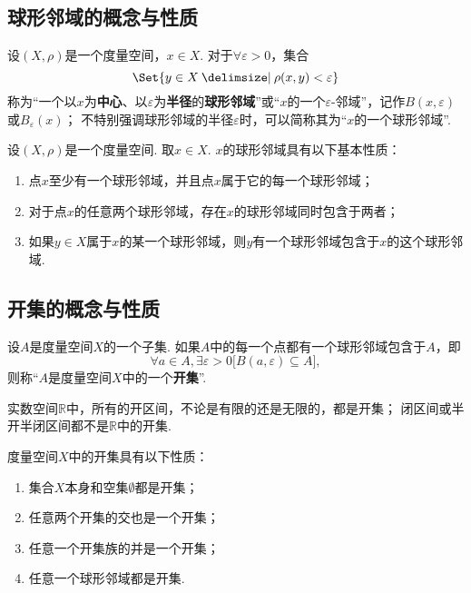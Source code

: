 \subsection{球形邻域的概念与性质}
\begin{definition}\label{definition:测度论.球形邻域的概念}
设\((X,\rho)\)是一个度量空间，\(x \in X\).
对于\(\forall\varepsilon>0\)，集合\[
\Set{ y \in X \given \rho(x,y) < \varepsilon }
\]称为“一个以\(x\)为\textbf{中心}、以\(\varepsilon\)为\textbf{半径}的\textbf{球形邻域}”或“\(x\)的一个\(\varepsilon\)-邻域”，记作\(B(x,\varepsilon)\)或\(B_{\varepsilon}(x)\)；
不特别强调球形邻域的半径\(\varepsilon\)时，可以简称其为“\(x\)的一个球形邻域”.
\end{definition}

\begin{theorem}\label{theorem:测度论.球形邻域的性质}
设\((X,\rho)\)是一个度量空间.
取\(x \in X\).
\(x\)的球形邻域具有以下基本性质：
\begin{enumerate}
\item 点\(x\)至少有一个球形邻域，并且点\(x\)属于它的每一个球形邻域；
\item 对于点\(x\)的任意两个球形邻域，存在\(x\)的球形邻域同时包含于两者；
\item 如果\(y \in X\)属于\(x\)的某一个球形邻域，则\(y\)有一个球形邻域包含于\(x\)的这个球形邻域.
\end{enumerate}
\end{theorem}

\subsection{开集的概念与性质}
\begin{definition}\label{definition:测度论.开集的概念}
设\(A\)是度量空间\(X\)的一个子集.
如果\(A\)中的每一个点都有一个球形邻域包含于\(A\)，即\[
\forall a \in A, \exists\varepsilon>0 \bigl[ B(a,\varepsilon) \subseteq A \bigr],
\]则称“\(A\)是度量空间\(X\)中的一个\textbf{开集}”.
\end{definition}

\begin{example}
实数空间\(\mathbb{R}\)中，所有的开区间，不论是有限的还是无限的，都是开集；
闭区间或半开半闭区间都不是\(\mathbb{R}\)中的开集.
\end{example}

\begin{theorem}\label{theorem:测度论.开集的性质}
度量空间\(X\)中的开集具有以下性质：
\begin{enumerate}
\item 集合\(X\)本身和空集\(\emptyset\)都是开集；
\item 任意两个开集的交也是一个开集；
\item 任意一个开集族的并是一个开集；
\item 任意一个球形邻域都是开集.
\end{enumerate}
\end{theorem}


